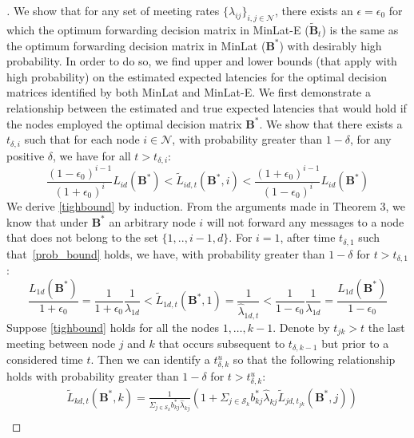 \documentclass[journal,onecolumn,11pt]{IEEEtran}
\theoremstyle{plain}
\theoremstyle{definition}
\begin{document}
\begin{proof}[\unskip\nopunct]
We show that for any set of meeting rates
$\{\lambda_{ij}\}_{i,j\in\mathcal{N}}$, there exists an
$\epsilon=\epsilon_0$ for which the optimum forwarding decision matrix
in MinLat-E ($\widetilde{\mathbf{B}}_t$) is the same as the optimum
forwarding decision matrix in MinLat ($\mathbf{B}^*$) with desirably
high probability. In order to do so, we find upper and lower bounds
(that apply with high probability) on the estimated expected latencies
for the optimal decision matrices identified by both MinLat and
MinLat-E.  We first demonstrate a relationship between the estimated and true
expected latencies that would hold if the nodes employed the optimal
decision matrix $\mathbf{B}^*$. 
We show that there exists a $t_{\delta,i}$ such that for each node $i \in
\mathcal{N}$, with probability greater than $1-\delta$, for any
positive $\delta$, we have for
all $t>t_{\delta,i}$:
\begin{equation}\label{tighbound}
\frac{(1-\epsilon_0)^{i-1}}{(1+\epsilon_0)^i} L_{id}(\mathbf{B}^*) < \widetilde{L}_{id,t}(\mathbf{B}^*,i) < \frac{(1+\epsilon_0)^{i-1}}{(1-\epsilon_0)^i} L_{id}(\mathbf{B}^*)
\end{equation}
We derive \eqref{tighbound} by induction.  From the arguments made in
Theorem 3, we know that under $\mathbf{B}^*$ an arbitrary node $i$
will not forward any messages to a node that does not belong to the
set $\{1,..,i-1,d\}$. For $i=1$, after time $t_{\delta,1}$ such
that~\eqref{prob_bound} holds, we have, with probability greater than
$1-\delta$ for $t>t_{\delta,1}$:
\begin{equation}
\frac{L_{1d}(\mathbf{B}^*)}{1+\epsilon_0}=\frac{1}{1+\epsilon_0}\frac{1}{\lambda_{1d}}<\widetilde{L}_{1d,t}(\mathbf{B}^*,1)=\frac{1}{\widehat{\lambda}_{1d,t}}
<\frac{1}{1-\epsilon_0}\frac{1}{\lambda_{1d}}=\frac{L_{1d}(\mathbf{B}^*)}{1-\epsilon_0}
\end{equation}
Suppose \eqref{tighbound} holds for all the nodes
$1,\dots,k-1$. Denote by $t_{jk}>t$ the last meeting between node $j$
and $k$ that occurs subsequent to $t_{\delta,k-1}$ but prior to a
considered time $t$. Then we can identify a $t^u_{\delta,k}$ so that the following relationship holds
with probability greater than $1-\delta$ for $t>t^u_{\delta,k}$:
\begin{subequations}
\begin{align}
&\widetilde{L}_{kd,t}(\mathbf{B}^*,k)
=\frac{1}{\Sigma_{j\in \mathcal{S}_k}b_{kj}^*\widehat{\lambda}_{kj}}(1+\Sigma_{j\in \mathcal{S}_k}b_{kj}^*\widehat{\lambda}_{kj}\widetilde{L}_{jd,t_{jk}}(\mathbf{B}^*,j))\\

\end{align}
\end{subequations}
\end{proof}
\end{document}

